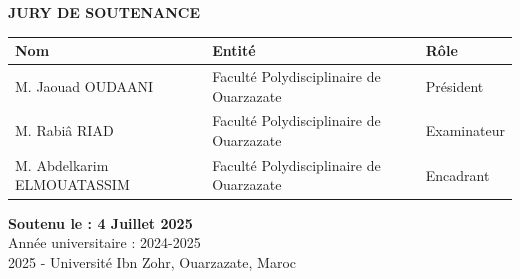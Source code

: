 \documentclass[12pt,a4paper]{report}
\begin{document}
\begin{titlepage}
    \begin{center}
        \colorbox{lightgraybox}{\color{blueuniv}\normalsize\textbf{\quad JURY DE SOUTENANCE \quad}}\\
        \vspace{0.5cm}
        
        \begin{tabular}{@{}lll@{}}
    Nom & Entité & Rôle \\
    \midrule
    M. Jaouad OUDAANI & Faculté Polydisciplinaire de Ouarzazate & Président \\
    M. Rabiâ RIAD & Faculté Polydisciplinaire de Ouarzazate & Examinateur \\
    M. Abdelkarim ELMOUATASSIM & Faculté Polydisciplinaire de Ouarzazate & Encadrant \\
    
    
  \end{tabular}
    \end{center}

    \vspace{0.5cm}

    \begin{center}
        \begin{minipage}{0.6\textwidth}
            \centering
            {\normalsize \textbf{Soutenu le : 4 Juillet 2025}}\\
            \vspace{0.2cm}
            Année universitaire : 2024-2025\\
            \vspace{0.2cm}
            \textcopyright{} 2025 - Université Ibn Zohr, Ouarzazate, Maroc
        \end{minipage}
    \end{center}

    \restoregeometry
\end{titlepage}

\newpage


\tableofcontents
\newpage







\end{document}
